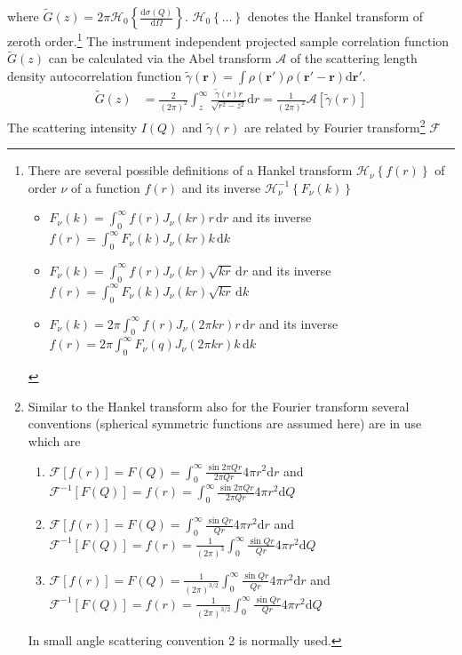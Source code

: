 where $\tilde{G}(z)=2\pi\mathcal{H}_0\left\{\frac{\mathrm{d}\sigma(Q)}{\mathrm{d}\Omega}\right\}$. $\mathcal{H}_0\left\{\ldots\right\}$ denotes the Hankel transform of zeroth order.\footnote{
There are several possible definitions of a Hankel transform $\mathcal{H}_\nu\left\{f(r)\right\}$ of order $\nu$ of a function $f(r)$ and its inverse $\mathcal{H}_\nu^{-1}\left\{F_\nu(k)\right\}$
\begin{itemize}
\item $F_\nu(k) = \int_0^\infty f(r) J_\nu(kr) r \,\mathrm{d}r$ and its inverse $f(r)=\int_0^\infty F_\nu(k)J_\nu(kr) k \,\mathrm{d}k$
\item $F_\nu(k) = \int_0^\infty f(r) J_\nu(kr) \sqrt{kr} \,\mathrm{d}r$ and its inverse $f(r)=\int_0^\infty F_\nu(k)J_\nu(kr)  \sqrt{kr}  \, \mathrm{d}k$
\item $F_\nu(k) = 2\pi \int_0^\infty f(r) J_\nu(2\pi kr) r \,\mathrm{d}r$ and its inverse $f(r)=2\pi \int_0^\infty F_\nu(q)J_\nu(2\pi kr) k \,\mathrm{d}k$
\end{itemize}
}
The instrument independent projected sample correlation function $\tilde{G}(z)$ can be calculated via the Abel transform $\mathcal{A}$ of the scattering length density autocorrelation function $\tilde{\gamma}(\mathbf{r})=\int \rho(\mathbf{r'})\rho(\mathbf{r'-r})\mathrm{d}\mathbf{r'}$.
\begin{align}
\tilde{G}(z) &= \frac{2}{(2\pi)^2} \int_z^\infty \frac{\tilde{\gamma}(r) r}{\sqrt{r^2-z^2}} \mathrm{d}r = \frac{1}{(2\pi)^2} \mathcal{A}\left[\tilde{\gamma}(r)\right]
\end{align}
The scattering intensity $I(Q)$ and  $\tilde{\gamma}(r)$ are related by Fourier transform\footnote{Similar to the Hankel transform also for the Fourier transform several conventions (spherical symmetric functions are assumed here) are in use which are
\begin{enumerate}
\item $\mathcal{F}[f(r)]=F(Q)=\int_0^\infty \frac{\sin 2\pi Qr}{2\pi Qr}4\pi r^2\mathrm{d}r$ and $\mathcal{F}^{-1}[F(Q)]=f(r)=\int_0^\infty \frac{\sin 2\pi Qr}{2\pi Qr}4\pi r^2\mathrm{d}Q$
\item $\mathcal{F}[f(r)]=F(Q)=\int_0^\infty \frac{\sin Qr}{Qr}4\pi r^2\mathrm{d}r$ and $\mathcal{F}^{-1}[F(Q)]=f(r)=\frac{1}{(2\pi)^3}\int_0^\infty \frac{\sin Qr}{Qr}4\pi r^2\mathrm{d}Q$
\item $\mathcal{F}[f(r)]=F(Q)=\frac{1}{(2\pi)^{3/2}}\int_0^\infty \frac{\sin Qr}{ Qr}4\pi r^2\mathrm{d}r$ and $\mathcal{F}^{-1}[F(Q)]=f(r)=\frac{1}{(2\pi)^{3/2}}\int_0^\infty \frac{\sin Qr}{Qr}4\pi r^2\mathrm{d}Q$
\end{enumerate}
In small angle scattering convention 2 is normally used.
} $\mathcal{F}$
